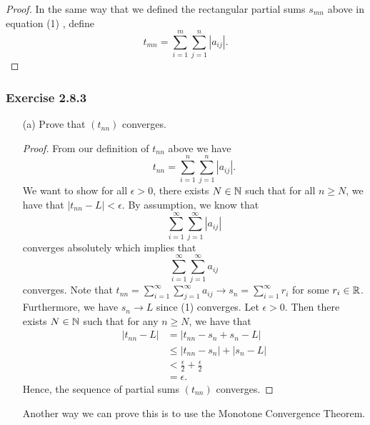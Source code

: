 \begin{proof}
    In the same way that we defined the rectangular partial sums \( s_{mn}\) above in equation (1)
    , define 
    \[ t_{mn} =  \sum_{ i=1 }^{ m } \sum_{ j=1 }^{ n }  | a_{ij} |.\] 

\end{proof}



\subsubsection{Exercise 2.8.3}

\begin{enumerate}
    \item[(a)] Prove that \( (t_{nn})\) converges. 
        \begin{proof}
            From our definition of \( t_{nn}\) above we have 
            \[ t_{nn} = \sum_{ i=1 }^{ n } \sum_{ j=1 }^{ n } | a_{ij} |.\] 
            We want to show for all \(\epsilon > 0 \), there exists \( N \in \mathbb{N} \) such that for all \( n \geq  N \), we have that  \( |t_{nn} - L  | < \epsilon \). By assumption, we know that 
            \[  \sum_{ i=1 }^{ \infty  } \sum_{ j=1 }^{ \infty  } | a_{ij} |  \tag{1}\] 
            converges absolutely which implies that 
            \[  \sum_{ i=1 }^{ \infty  } \sum_{ j=1 }^{ \infty   } a_{ij} \] 
            converges. Note that \( t_{nn} = \sum_{ i=1 }^{ \infty   } \sum_{ j=1 }^{ \infty  } a_{ij}  \to s_n = \sum_{ i=1 }^{ \infty  } r_i \) for some \( r_i \in \mathbb{R}  \). Furthermore, we have \( s_n \to L  \) since (1) converges. Let \( \epsilon  > 0  \). Then there exists \(  N \in \mathbb{N}  \) such that for any \(  n \geq N  \), we have that 
            \begin{align*}
                | t_{nn} - L  | &= | t_{nn} -s_n + s_n - L |  \\
                                &\leq  | t_{nn} - s_n  | + | s_n - L  | \\
                                &< \frac{ \epsilon  }{ 2 } + \frac{ \epsilon  }{ 2 } \\
                                &= \epsilon.
            \end{align*}
            Hence, the sequence of partial sums \(  (t_{nn}) \) converges. 
        \end{proof}

        Another way we can prove this is to use the Monotone Convergence Theorem. 


\end{enumerate}

